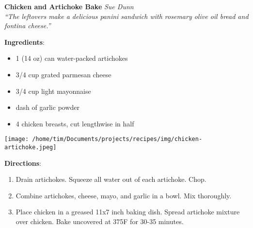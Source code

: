 \documentclass[11pt, twoside, openany]{book}
\begin{document}
\noindent\begin{minipage}[t]{\linewidth}%
{\Large\textbf{Chicken and Artichoke Bake}} \label{chicken-and-artichoke-bake}\hfill\textit{Sue Dunn}\\
\textit{``The leftovers make a delicious panini sandwich with rosemary olive oil bread and fontina cheese.''}\\
\noindent\begin{minipage}[t]{0.78\linewidth}%
\textbf{Ingredients}:\vspace{-3mm}
\begin{multicols}{2}
\begin{itemize}\setlength\itemsep{-1mm}
\item 1 (14 oz) can water-packed artichokes
\item 3/4 cup grated parmesan cheese
\item 3/4 cup light mayonnaise
\item dash of garlic powder
\item 4 chicken breasts, cut lengthwise in half
\end{itemize}
\end{multicols}
\end{minipage}
\noindent\begin{minipage}[t]{0.18\linewidth}
\centering \strut\vspace*{-\baselineskip}\newline
\texttt{[image: /home/tim/Documents/projects/recipes/img/chicken-artichoke.jpeg]}\\
\end{minipage}\vspace{3mm}
\textbf{Directions}:
\vspace{-3mm}\begin{enumerate}\setlength\itemsep{-1mm}
\item Drain artichokes. Squeeze all water out of each artichoke. Chop.
\item Combine artichokes, cheese, mayo, and garlic in a bowl. Mix thoroughly.
\item Place chicken in a greased 11x7 inch baking dish. Spread artichoke mixture over chicken. Bake uncovered at 375F for 30-35 minutes.
\end{enumerate}
\end{minipage}\vspace{8mm}
\end{document}
